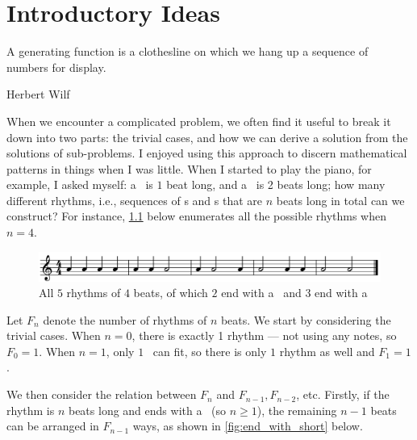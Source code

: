 \documentclass[a4paper, 12pt]{report}
\begin{document}

\addtocounter{page}{1}
\tableofcontents

\chapter{Introductory Ideas}\label{ch:intro}
\singlespacing
\epigraph{A generating function is a clothesline on which we hang up a sequence of numbers for display.}{Herbert Wilf \autocite*[1]{wilf}}
\doublespacing


When we encounter a complicated problem, we often find it useful to break it down into two parts: the trivial cases, and how we can derive a solution from the solutions of sub-problems. I enjoyed using this approach to discern mathematical patterns in things when I was little. When I started to play the piano, for example, I asked myself: a \Vier\ is $1$ beat long, and a \Halb\ is 2 beats long; how many different rhythms, i.e., sequences of \Vier s and \Halb s that are $n$ beats long in total can we construct? For instance, \cref{fig:5_beats} below enumerates all the possible rhythms when $n = 4$.

\begin{figure}[h]
    \centering
    \includegraphics[width=\textwidth]{patterns.png}
    \caption{All $5$ rhythms of $4$ beats, of which $2$ end with a \Halb\ and $3$ end with a \Vier}
    \label{fig:5_beats}
\end{figure}

Let $F_n$ denote the number of rhythms of $n$ beats. We start by considering the trivial cases. When $n = 0$, there is exactly 1 rhythm --- not using any notes, so $F_0 = 1$. When $n = 1$, only $1$ \Vier\ can fit, so there is only $1$ rhythm as well and $F_1 = 1$.

We then consider the relation between $F_n$ and $F_{n - 1}, F_{n - 2}$, etc. Firstly, if the rhythm is $n$ beats long and ends with a \Vier\ (so $n \geq 1$), the remaining $n - 1$ beats can be arranged in $F_{n - 1}$ ways, as shown in \cref{fig:end_with_short} below.
\end{document}
